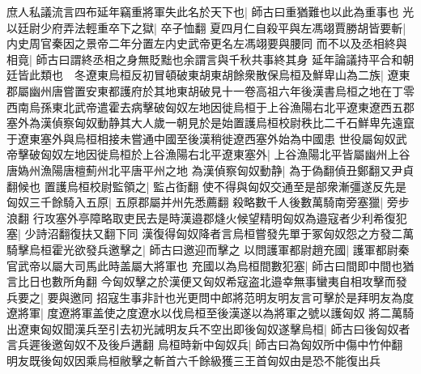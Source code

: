 庶人私議流言四布延年竊重將軍失此名於天下也|{
	師古曰重猶難也以此為重事也}
光以廷尉少府弄法輕重卒下之獄|{
	卒子恤翻}
夏四月仁自殺平與左馮翊賈勝胡皆要斬|{
	内史周官秦因之景帝二年分置左内史武帝更名左馮翊要與腰同}
而不以及丞相終與相竟|{
	師古曰謂終丞相之身無貶黜也余謂言與千秋共事終其身}
延年論議持平合和朝廷皆此類也　冬遼東烏桓反初冒頓破東胡東胡餘衆散保烏桓及鮮卑山為二族|{
	遼東郡屬幽州唐嘗置安東都護府於其地東胡破見十一卷高祖六年後漢書烏桓之地在丁零西南烏孫東北武帝遣霍去病擊破匈奴左地因徙烏桓于上谷漁陽右北平遼東遼西五郡塞外為漢偵察匈奴動静其大人歲一朝見於是始置護烏桓校尉秩比二千石鮮卑先遠竄于遼東塞外與烏桓相接未嘗通中國至後漢稍徙遼西塞外始為中國患}
世役屬匈奴武帝擊破匈奴左地因徙烏桓於上谷漁陽右北平遼東塞外|{
	上谷漁陽北平皆屬幽州上谷唐媯州漁陽唐檀薊州北平唐平州之地}
為漢偵察匈奴動静|{
	為于偽翻偵丑鄭翻又尹貞翻候也}
置護烏桓校尉監領之|{
	監占衘翻}
使不得與匈奴交通至是部衆漸彊遂反先是匈奴三千餘騎入五原|{
	五原郡屬并州先悉薦翻}
殺略數千人後數萬騎南旁塞獵|{
	旁步浪翻}
行攻塞外亭障略取吏民去是時漢邉郡熢火候望精明匈奴為邉寇者少利希復犯塞|{
	少詩沼翻復扶又翻下同}
漢復得匈奴降者言烏桓嘗發先單于冢匈奴怨之方發二萬騎擊烏桓霍光欲發兵邀擊之|{
	師古曰邀迎而擊之}
以問護軍都尉趙充國|{
	護軍都尉秦官武帝以屬大司馬此時盖屬大將軍也}
充國以為烏桓間數犯塞|{
	師古曰間即中間也猶言比日也數所角翻}
今匈奴擊之於漢便又匈奴希寇盗北邉幸無事蠻夷自相攻擊而發兵要之|{
	要與邀同}
招寇生事非計也光更問中郎將范明友明友言可擊於是拜明友為度遼將軍|{
	度遼將軍盖使之度遼水以伐烏桓至後漢遂以為將軍之號以護匈奴}
將二萬騎出遼東匈奴聞漢兵至引去初光誡明友兵不空出即後匈奴遂擊烏桓|{
	師古曰後匈奴者言兵遲後邀匈奴不及後戶遘翻}
烏桓時新中匈奴兵|{
	師古曰為匈奴所中傷中竹仲翻}
明友既後匈奴因乘烏桓敝擊之斬首六千餘級獲三王首匈奴由是恐不能復出兵


